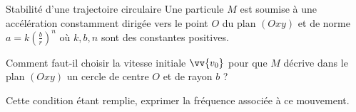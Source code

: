 \begin{exo}[PCSI]{Stabilité d'une trajectoire circulaire}
Une particule $M$ est soumise à une accélération constamment dirigée vers le point $O$ du plan $(Oxy)$ et de norme $a=k\left(\frac{b}{r}\right)^n$ où $k,b,n$ sont des constantes positives.
\begin{quest}
\item Comment faut-il choisir la vitesse initiale $\vv{v_0}$ pour que $M$ décrive dans le plan $(Oxy)$ un cercle de centre $O$ et de rayon $b$ ?
\item Cette condition étant remplie, exprimer la fréquence associée à ce mouvement.
\end{quest}
\end{exo}


